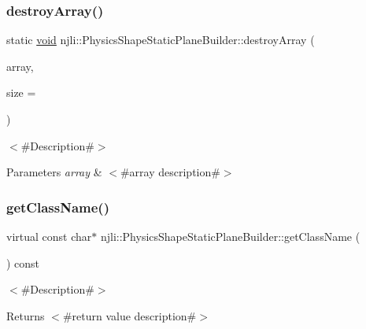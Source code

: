 \subsubsection{\texorpdfstring{destroy\+Array()}{destroyArray()}}
{\footnotesize\ttfamily static \mbox{\hyperlink{_thread_8h_af1e856da2e658414cb2456cb6f7ebc66}{void}} njli\+::\+Physics\+Shape\+Static\+Plane\+Builder\+::destroy\+Array (\begin{DoxyParamCaption}\item[{\mbox{\hyperlink{classnjli_1_1_physics_shape_static_plane_builder}{Physics\+Shape\+Static\+Plane\+Builder}} $\ast$$\ast$}]{array,  }\item[{const \mbox{\hyperlink{_util_8h_a10e94b422ef0c20dcdec20d31a1f5049}{u32}}}]{size = {} }\end{DoxyParamCaption})\hspace{0.3cm}{\ttfamily [static]}}

$<$\#\+Description\#$>$


\begin{DoxyParams}{Parameters}
{\em array} & $<$\#array description\#$>$ \\
\hline
\end{DoxyParams}
\mbox{\label{classnjli_1_1_physics_shape_static_plane_builder_a22d054588024c9b23d225abfe4fdb146}} 
\subsubsection{\texorpdfstring{get\+Class\+Name()}{getClassName()}}
{\footnotesize\ttfamily virtual const char$\ast$ njli\+::\+Physics\+Shape\+Static\+Plane\+Builder\+::get\+Class\+Name (\begin{DoxyParamCaption}{ }\end{DoxyParamCaption}) const\hspace{0.3cm}{\ttfamily [virtual]}}

$<$\#\+Description\#$>$

\begin{DoxyReturn}{Returns}
$<$\#return value description\#$>$ 
\end{DoxyReturn}


